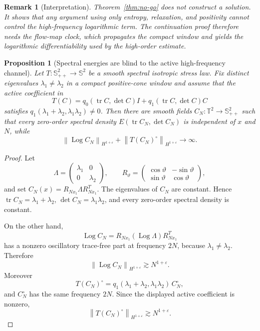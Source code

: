 \documentclass[11pt]{article}
\newtheorem{proposition}{Proposition}[section]
\newtheorem{remark}{Remark}[section]
\newcommand{\T}{\mathbb T}
\newcommand{\Spp}{\mathbb S_{++}}
\newcommand{\Sym}{\mathbb S}
\newcommand{\tr}{\operatorname{tr}}
\newcommand{\Log}{\operatorname{Log}}
\newcommand{\eps}{\varepsilon}
\newcommand{\norm}[1]{\left\lVert #1\right\rVert}
\begin{document}
\begin{remark}[Interpretation]
Theorem~\ref{thm:no-go} does not construct a solution.  It shows that any
argument using only entropy, relaxation, and positivity cannot control the
high-frequency logarithmic term.  The continuation proof therefore needs the
flow-map clock, which propagates the compact window and yields the
logarithmic differentiability used by the high-order estimate.
\end{remark}

\begin{proposition}[Spectral energies are blind to the active high-frequency channel]
\label{prop:spectral-energy-active-blind}
Let \(T:\Spp^2\to\Sym^2\) be a smooth spectral isotropic stress law.  Fix
distinct eigenvalues \(\lambda_1\ne\lambda_2\) in a compact positive-cone
window and assume that the active coefficient in
\[
  T(C)=q_0(\tr C,\det C)I+q_1(\tr C,\det C)C
\]
satisfies \(q_1(\lambda_1+\lambda_2,\lambda_1\lambda_2)\ne0\).  Then there are
smooth fields \(C_N:\T^2\to\Spp^2\) such that every zero-order spectral density
\(E(\tr C_N,\det C_N)\) is independent of \(x\) and \(N\), while
\[
  \norm{\Log C_N}_{H^{1+\eps}}
  +\norm{T(C_N)^\circ}_{H^{1+\eps}}\to\infty .
\]
\end{proposition}

\begin{proof}
Let
\[
  \Lambda=\begin{pmatrix}\lambda_1&0\\0&\lambda_2\end{pmatrix},
  \qquad
  R_\vartheta=
  \begin{pmatrix}
    \cos\vartheta&-\sin\vartheta\\
    \sin\vartheta&\cos\vartheta
  \end{pmatrix},
\]
and set \(C_N(x)=R_{Nx_1}\Lambda R_{Nx_1}^T\).  The eigenvalues of \(C_N\) are
constant.  Hence \(\tr C_N=\lambda_1+\lambda_2\), \(\det C_N=\lambda_1\lambda_2\),
and every zero-order spectral density is constant.

On the other hand,
\[
  \Log C_N
  =R_{Nx_1}(\Log\Lambda)R_{Nx_1}^T
\]
has a nonzero oscillatory trace-free part at frequency \(2N\), because
\(\lambda_1\ne\lambda_2\).  Therefore
\[
  \norm{\Log C_N}_{H^{1+\eps}}\gtrsim N^{1+\eps}.
\]
Moreover
\[
  T(C_N)^\circ
  =
  q_1(\lambda_1+\lambda_2,\lambda_1\lambda_2)\,C_N^\circ ,
\]
and \(C_N^\circ\) has the same frequency \(2N\).  Since the displayed active
coefficient is nonzero,
\[
  \norm{T(C_N)^\circ}_{H^{1+\eps}}\gtrsim N^{1+\eps}.
\]
\end{proof}
\end{document}
